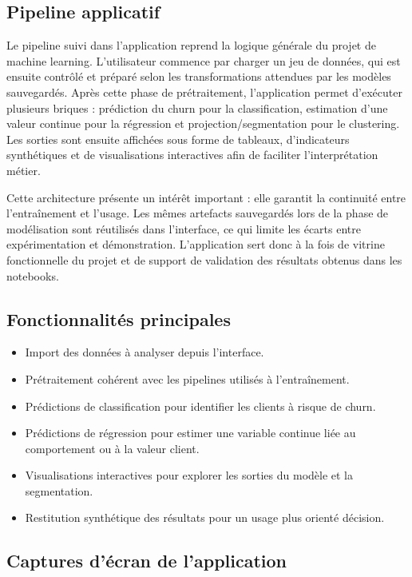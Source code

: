 \documentclass[11pt,a4paper]{article}
\begin{document}
\subsection{Pipeline applicatif}
Le pipeline suivi dans l'application reprend la logique générale du projet de machine learning. L'utilisateur commence par charger un jeu de données, qui est ensuite contrôlé et préparé selon les transformations attendues par les modèles sauvegardés. Après cette phase de prétraitement, l'application permet d'exécuter plusieurs briques : prédiction du churn pour la classification, estimation d'une valeur continue pour la régression et projection/segmentation pour le clustering. Les sorties sont ensuite affichées sous forme de tableaux, d'indicateurs synthétiques et de visualisations interactives afin de faciliter l'interprétation métier.

Cette architecture présente un intérêt important : elle garantit la continuité entre l'entraînement et l'usage. Les mêmes artefacts sauvegardés lors de la phase de modélisation sont réutilisés dans l'interface, ce qui limite les écarts entre expérimentation et démonstration. L'application sert donc à la fois de vitrine fonctionnelle du projet et de support de validation des résultats obtenus dans les notebooks.

\subsection{Fonctionnalités principales}
\begin{itemize}
    \item Import des données à analyser depuis l'interface.
    \item Prétraitement cohérent avec les pipelines utilisés à l'entraînement.
    \item Prédictions de classification pour identifier les clients à risque de churn.
    \item Prédictions de régression pour estimer une variable continue liée au comportement ou à la valeur client.
    \item Visualisations interactives pour explorer les sorties du modèle et la segmentation.
    \item Restitution synthétique des résultats pour un usage plus orienté décision.
\end{itemize}

\subsection{Captures d'écran de l'application}
\end{document}
